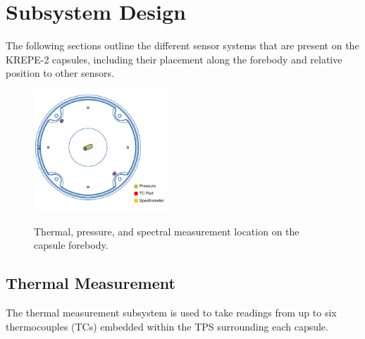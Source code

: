 \documentclass{article}
\begin{document}




\section{Subsystem Design}
\label{sec:subsystems}

The following sections outline the different sensor systems that are present on the KREPE-2 capsules, including their placement along the forebody and relative position to other sensors. 

\begin{figure}
\centering
\includegraphics[width=5cm]{images/tps_cad_highlight}
\label{fig:sensor-locations}
\caption{Thermal, pressure, and spectral measurement location on the capsule forebody.}
\end{figure}

\subsection{Thermal Measurement}
The thermal measurement subsystem is used to take readings from up to six thermocouples (TCs) embedded within the TPS surrounding each capsule. 
\end{document}

